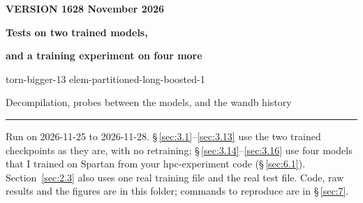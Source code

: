 \documentclass[paper=a4,fontsize=11pt,DIV=11,parskip=half,headings=small,numbers=noendperiod]{scrartcl}
\DeclareRobustCommand{\code}[1]{{\fontseries{m}\ttfamily #1}}
\begin{document}
\begin{flushleft}
{\sffamily\bfseries\color{accent}\small\MakeUppercase{Version 16}\hspace{0.7em}\textcolor{rulegray}{\textperiodcentered}\hspace{0.7em}\textcolor{rulegray}{28 November 2026}\par}
\vspace{8pt}
{\sffamily\bfseries\fontsize{24}{28}\selectfont Tests on two trained models,\par}
\vspace{0pt}
{\sffamily\bfseries\fontsize{24}{28}\selectfont and a training experiment on four more\par}
\vspace{8pt}
{\ttfamily\fontsize{15}{19}\selectfont torn-bigger-13}
\vspace{3pt}
{\ttfamily\fontsize{15}{19}\selectfont elem-partitioned-long-boosted-1}\hspace{0.5em}{\sffamily\large (elementary transpositions)\par}
\vspace{6pt}
{\sffamily\color{rulegray}Decompilation, probes between the models, and the wandb history\par}
\vspace{6pt}
{\color{accent}\rule{\linewidth}{1.1pt}}
\end{flushleft}

Run on 2026-11-25 to 2026-11-28. \S\,\ref{sec:3.1}–\ref{sec:3.13} use the two trained checkpoints as they are,
with no retraining; \S\,\ref{sec:3.14}–\ref{sec:3.16} use four models that I trained on Spartan from your
\code{hpc-\allowbreak{}experiment} code (\S\,\ref{sec:6.1}). Section~\ref{sec:2.3} also uses one real training
file and the real test file. Code, raw results and the figures are in this folder; commands to reproduce are in
\S\,\ref{sec:7}.
\end{document}
